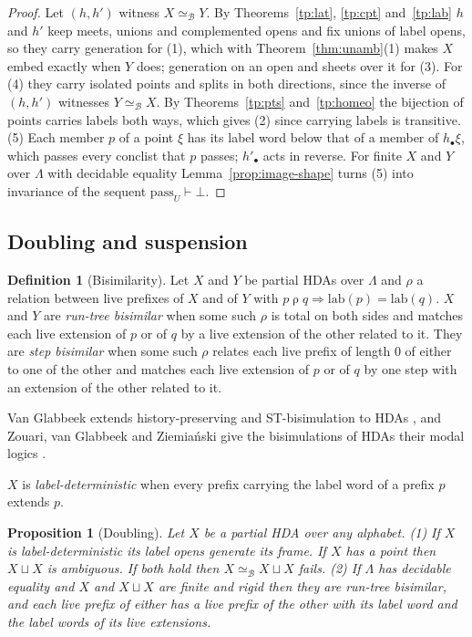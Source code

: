 \documentclass{lmcs}
\newtheorem{proposition}[theorem]{Proposition}
\theoremstyle{definition}
\newtheorem{definition}[theorem]{Definition}
\theoremstyle{remark}
\newcommand{\lab}{\mathrm{lab}}
\providecommand{\dsum}{\sqcup}
\providecommand{\lab}{\mathrm{lab}}
\providecommand{\eqB}{\simeq_{\mathcal{B}}}
\providecommand{\dsum}{\sqcup}
\begin{document}
\begin{proof}
Let $(h,h')$ witness $X\eqB Y$. By Theorems~\ref{tp:lat}, \ref{tp:cpt} and~\ref{tp:lab} $h$ and $h'$ keep
meets, unions and complemented opens and fix unions of label opens, so they carry
generation for (1), which with
Theorem~\ref{thm:unamb}(1) makes $X$ embed exactly when $Y$ does; generation on an open and sheets over
it for
(3). For (4) they carry isolated points and
splits in both directions, since the inverse of $(h,h')$ witnesses
$Y\eqB X$. By Theorems~\ref{tp:pts} and~\ref{tp:homeo} the bijection of points carries labels both ways, which gives (2)
since carrying labels is
transitive.
(5) Each member $p$ of a point $\xi$ has its label word below that of a member of $h_\bullet\xi$, which passes every
conclist that $p$ passes; $h'_\bullet$ acts in reverse.
For finite $X$ and $Y$ over $\Lambda$ with decidable equality Lemma~\ref{prop:image-shape} turns (5) into
invariance of the sequent $\mathrm{pass}_U\vdash\bot$.
\end{proof}

\subsection{Doubling and suspension}\label{ssec:image-double}

\begin{definition}[Bisimilarity]\label{def:image-bisim}\label{def:image-stepbisim}
Let $X$ and $Y$ be partial HDAs over $\Lambda$ and $\rho$ a relation between live prefixes of $X$ and of $Y$ with
$p\mathrel{\rho}q\Rightarrow\lab(p)=\lab(q)$. $X$ and $Y$ are \emph{run-tree bisimilar} when some such $\rho$ is total
on both sides and matches each live extension of $p$ or of $q$ by a live extension of the other related to
it. They are \emph{step bisimilar} when some such $\rho$ relates each live prefix of length $0$
of either to one of the other and matches each live extension of $p$ or of $q$ by one step with an extension of the
other related to it.
\end{definition}

Van Glabbeek extends history-preserving and ST-bisimulation to HDAs \cite{vG06},
and Zouari, van Glabbeek and Ziemia\'nski give the bisimulations of HDAs their modal logics \cite{ZvGZ26}.

$X$ is \emph{label-deterministic} when every prefix carrying the label word of a prefix $p$ extends
$p$.

\begin{proposition}[Doubling]\label{thm:image-double}\label{prop:image-double}
Let $X$ be a partial HDA over any alphabet.
(1) If $X$ is label-deterministic its label opens generate its frame. If $X$
  has a point then $X\dsum X$ is ambiguous. If both hold then $X\eqB X\dsum X$
  fails.
(2) If $\Lambda$ has decidable equality and $X$ and $X\dsum X$ are finite and rigid then they are run-tree
  bisimilar, and each live prefix of either has a live prefix of the other with
  its label word and the label words of its live extensions.
\end{proposition}
\end{document}
